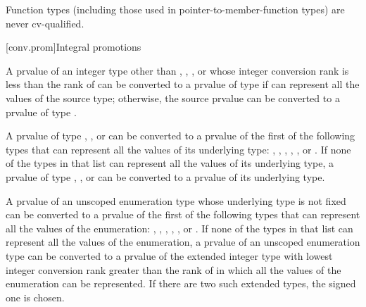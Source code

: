 \pnum
\begin{note}
Function types (including those used in pointer-to-member-function types)
are never cv-qualified.
\end{note}

[conv.prom]{Integral promotions}

\pnum
{}%
A prvalue of an integer type other than , ,
, or  whose integer conversion
rank is less than the rank of  can be
converted to a prvalue of type  if  can represent
all the values of the source type; otherwise, the source prvalue can be
converted to a prvalue of type .

\pnum
{}%
%
%
A prvalue of type , , or
 can be converted to a prvalue
of the first of the following types that can represent all the values of
its underlying type: , , ,
, ,
or . If none of the types in that list can
represent all the values of its underlying type, a prvalue of type
, , or  can be converted
to a prvalue of its underlying type.

\pnum
{}%
A prvalue of an unscoped enumeration type whose underlying type is not
fixed can be converted to a prvalue of the first of the following
types that can represent all the values of the enumeration: ,
, , ,
, or . If none of the types in that
list can represent all the values of the enumeration, a prvalue of an unscoped
enumeration type can be converted to a prvalue of the extended integer type with lowest
integer conversion rank greater than the rank of 
in which all the values of the enumeration can be represented. If there are
two such extended types, the signed one is chosen.

